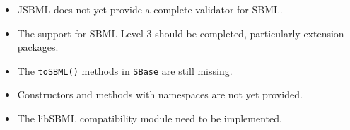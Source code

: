 \begin{itemize}
\item JSBML does not yet provide a complete validator for SBML.
\item The support for SBML Level 3 should be completed, particularly extension packages.
\item The \texttt{toSBML()}
methods in \texttt{SBase} are still missing.
\item Constructors and methods with namespaces are not yet provided.
\item The libSBML compatibility module need
to be implemented.
\end{itemize}
